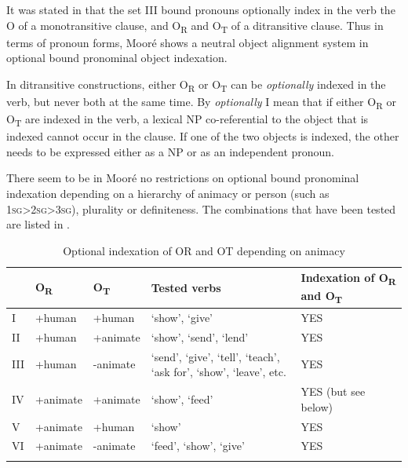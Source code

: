\documentclass[output=paper]{langsci/langscibook}
\begin{document}
\z

It was stated in  that the set III bound pronouns optionally index in the verb the O of a monotransitive clause, and O\textsubscript{R} and O\textsubscript{T} of a ditransitive clause. Thus in terms of pronoun forms, Mooré shows a neutral object alignment system in optional bound pronominal object indexation.  

In ditransitive constructions, either O\textsubscript{R} or O\textsubscript{T} can be \textit{optionally} indexed in the verb, but never both at the same time. By \textit{optionally} I mean that if either O\textsubscript{R} or O\textsubscript{T} are indexed in the verb, a lexical NP co-referential to the object that is indexed cannot occur in the clause. If one of the two objects is indexed, the other needs to be expressed either as a NP or as an independent pronoun. 

There seem to be in Mooré no restrictions on optional bound pronominal indexation depending on a hierarchy of animacy or person (such as 1\textsc{sg}>2\textsc{sg}>3\textsc{sg}), plurality or definiteness. The combinations that have been tested are listed in .

\begin{table}
\begin{tabularx}{\textwidth}{lll>{\raggedright\arraybackslash}Xl} 
\lsptoprule & {O}{\textsubscript{R}} & {O}{\textsubscript{T}} & {Tested verbs} & {Indexation of O}{\textsubscript{R}}{ and O}{\textsubscript{T}}{} \\
\midrule
I & +human & +human & `show', `give' & YES\\
II & +human & +animate & `show', `send', `lend' & YES\\
III & +human & -animate & `send', `give', `tell', `teach', `ask for', `show', `leave', etc. & YES\\
IV & +animate & +animate & `show', `feed' & YES (but see below)\\
V & +animate & +human & `show' & YES\\
VI & +animate & -animate & `feed', `show', `give' & YES\\
\lspbottomrule
\end{tabularx}
\caption{Optional indexation of OR and OT depending on animacy}
\label{tab:3.pacchiarotti}

 \end{table}
\end{document}
